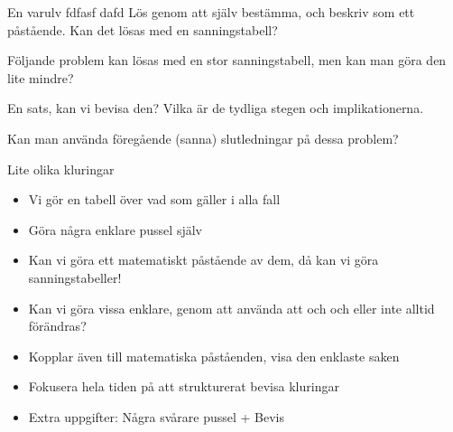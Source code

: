 \begin{problem}
	En varulv fdfasf dafd
	Lös genom att själv bestämma, och beskriv som ett påstående. Kan det lösas med en sanningstabell?
\end{problem}

\begin{problem}
	Följande problem kan lösas med en stor sanningstabell, men kan man göra den lite mindre?
\end{problem}

\begin{problem}
	En sats, kan vi bevisa den? Vilka är de tydliga stegen och implikationerna.
\end{problem}

\begin{problem}
	Kan man använda föregående (sanna) slutledningar på dessa problem?
\end{problem}

\begin{problem}
	Lite olika kluringar
\end{problem}




\begin{itemize}
	\item Vi gör en tabell över vad som gäller i alla fall
	\item Göra några enklare pussel själv
	\item Kan vi göra ett matematiskt påstående av dem, då kan vi göra sanningstabeller!
	\item Kan vi göra vissa enklare, genom att använda att och och eller inte alltid förändras?
	\item Kopplar även till matematiska påståenden, visa den enklaste saken
	\item Fokusera hela tiden på att strukturerat bevisa kluringar
	\item Extra uppgifter: Några svårare pussel + Bevis
\end{itemize}

